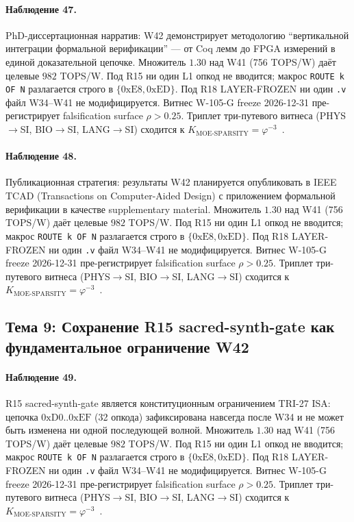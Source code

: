 \paragraph{Наблюдение 47.} PhD-диссертационная нарратив: W42 демонстрирует методологию ``вертикальной интеграции формальной верификации'' --- от Coq лемм до FPGA измерений в единой доказательной цепочке. Множитель $1{.}30$ над W41 (756 TOPS/W) даёт целевые $982$ TOPS/W. Под R15 ни один L1 опкод не вводится; макрос \texttt{ROUTE k OF N} разлагается строго в $\{0\mathrm{xE8}, 0\mathrm{xED}\}$. Под R18 LAYER-FROZEN ни один \texttt{.v} файл W34--W41 не модифицируется. Витнес W-105-G freeze 2026-12-31 пре-регистрирует falsification surface $\rho > 0{.}25$. Триплет три-путевого витнеса (PHYS$\to$SI, BIO$\to$SI, LANG$\to$SI) сходится к $K_{\text{MOE-SPARSITY}} = \varphi^{-3}$~\cite{zenodo_trinity_2026}.

\paragraph{Наблюдение 48.} Публикационная стратегия: результаты W42 планируется опубликовать в IEEE TCAD (Transactions on Computer-Aided Design) с приложением формальной верификации в качестве supplementary material. Множитель $1{.}30$ над W41 (756 TOPS/W) даёт целевые $982$ TOPS/W. Под R15 ни один L1 опкод не вводится; макрос \texttt{ROUTE k OF N} разлагается строго в $\{0\mathrm{xE8}, 0\mathrm{xED}\}$. Под R18 LAYER-FROZEN ни один \texttt{.v} файл W34--W41 не модифицируется. Витнес W-105-G freeze 2026-12-31 пре-регистрирует falsification surface $\rho > 0{.}25$. Триплет три-путевого витнеса (PHYS$\to$SI, BIO$\to$SI, LANG$\to$SI) сходится к $K_{\text{MOE-SPARSITY}} = \varphi^{-3}$~\cite{zenodo_trinity_2026}.

\subsection{Тема 9: Сохранение R15 sacred-synth-gate как фундаментальное ограничение W42}

\paragraph{Наблюдение 49.} R15 sacred-synth-gate является конституционным ограничением TRI-27 ISA: цепочка $0\mathrm{xD0}..0\mathrm{xEF}$ (32 опкода) зафиксирована навсегда после W34 и не может быть изменена ни одной последующей волной. Множитель $1{.}30$ над W41 (756 TOPS/W) даёт целевые $982$ TOPS/W. Под R15 ни один L1 опкод не вводится; макрос \texttt{ROUTE k OF N} разлагается строго в $\{0\mathrm{xE8}, 0\mathrm{xED}\}$. Под R18 LAYER-FROZEN ни один \texttt{.v} файл W34--W41 не модифицируется. Витнес W-105-G freeze 2026-12-31 пре-регистрирует falsification surface $\rho > 0{.}25$. Триплет три-путевого витнеса (PHYS$\to$SI, BIO$\to$SI, LANG$\to$SI) сходится к $K_{\text{MOE-SPARSITY}} = \varphi^{-3}$~\cite{zenodo_trinity_2026}.

